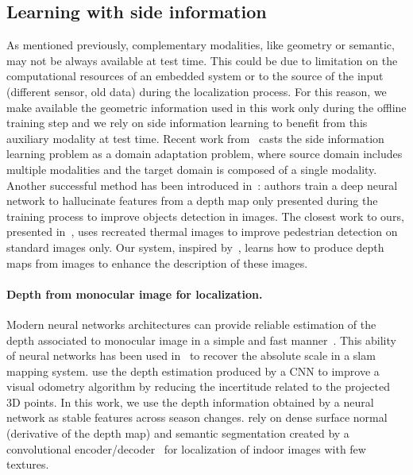 \subsection{Learning with side information}
As mentioned previously, complementary modalities, like geometry or semantic, may not be always available at test time. This could be due to limitation on the computational resources of an embedded system or to the source of the input (different sensor, old data) during the localization process. For this reason, we make available the geometric information used in this work only during the offline training step and we rely on side information learning to benefit from this auxiliary modality at test time. Recent work from~\cite{Li2017b} casts the side information learning problem as a domain adaptation problem, where source domain includes multiple modalities and the target domain is composed of a single modality. Another successful method has been introduced in~\cite{Hoffman2016}: authors train a deep neural network to hallucinate features from a depth map only presented during the training process to improve objects detection in images. The closest work to ours, presented in~\citep{Xu2017b}, uses recreated thermal images to improve pedestrian detection on standard images only. Our system, inspired by~\citep{Xu2017b}, learns how to produce depth maps from images to enhance the description of these images.

\paragraph{Depth from monocular image for localization.} Modern neural networks architectures can provide reliable estimation of the depth associated to monocular image in a simple and fast manner~\citep{Eigen2014, Godard2017, Mahjourian2018}. This ability of neural networks has been used in~\citep{Tateno2017} to recover the absolute scale in a \ac{slam} mapping system. \citet{Loo2019} use the depth estimation produced by a CNN to improve a visual odometry algorithm by reducing the incertitude related to the projected 3D points. In this work, we use the depth information obtained by a neural network as stable features across season changes. \citet{Taira2019} rely on dense surface normal (derivative of the depth map) and semantic segmentation created by a convolutional encoder/decoder~\citep{Zamir2018} for localization of indoor images with few textures.